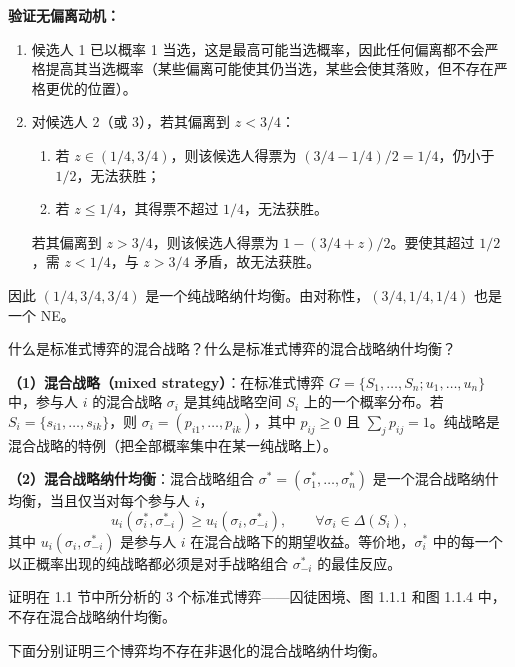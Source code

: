 \textbf{验证无偏离动机：}
\begin{enumerate}[leftmargin=2em]
  \item 候选人 1 已以概率 1 当选，这是最高可能当选概率，因此任何偏离都不会严格提高其当选概率（某些偏离可能使其仍当选，某些会使其落败，但不存在严格更优的位置）。
  \item 对候选人 2（或 3），若其偏离到 $z<3/4$：
    \begin{enumerate}
      \item 若 $z\in(1/4,3/4)$，则该候选人得票为 $(3/4-1/4)/2=1/4$，仍小于 $1/2$，无法获胜；
      \item 若 $z\le1/4$，其得票不超过 $1/4$，无法获胜。
    \end{enumerate}
    若其偏离到 $z>3/4$，则该候选人得票为 $1-(3/4+z)/2$。要使其超过 $1/2$，需 $z<1/4$，与 $z>3/4$ 矛盾，故无法获胜。
\end{enumerate}

因此 $(1/4,3/4,3/4)$ 是一个纯战略纳什均衡。由对称性，$(3/4,1/4,1/4)$ 也是一个 NE。


什么是标准式博弈的混合战略？什么是标准式博弈的混合战略纳什均衡？

\sol
\textbf{（1）混合战略（mixed strategy）}：在标准式博弈 $G=\{S_1,\dots,S_n;u_1,\dots,u_n\}$ 中，参与人 $i$ 的混合战略 $\sigma_i$ 是其纯战略空间 $S_i$ 上的一个概率分布。若 $S_i=\{s_{i1},\dots,s_{ik}\}$，则 $\sigma_i=(p_{i1},\dots,p_{ik})$，其中 $p_{ij}\ge0$ 且 $\sum_j p_{ij}=1$。纯战略是混合战略的特例（把全部概率集中在某一纯战略上）。

\textbf{（2）混合战略纳什均衡}：混合战略组合 $\sigma^*=(\sigma_1^*,\dots,\sigma_n^*)$ 是一个混合战略纳什均衡，当且仅当对每个参与人 $i$，
\[
  u_i(\sigma_i^*,\sigma_{-i}^*)\ge u_i(\sigma_i,\sigma_{-i}^*),\qquad \forall \sigma_i\in\Delta(S_i),
\]\indent
其中 $u_i(\sigma_i,\sigma_{-i}^*)$ 是参与人 $i$ 在混合战略下的期望收益。等价地，$\sigma_i^*$ 中的每一个以正概率出现的纯战略都必须是对手战略组合 $\sigma_{-i}^*$ 的最佳反应。

证明在 1.1 节中所分析的 3 个标准式博弈——囚徒困境、图 1.1.1 和图 1.1.4 中，不存在混合战略纳什均衡。

\sol
下面分别证明三个博弈均不存在非退化的混合战略纳什均衡。

